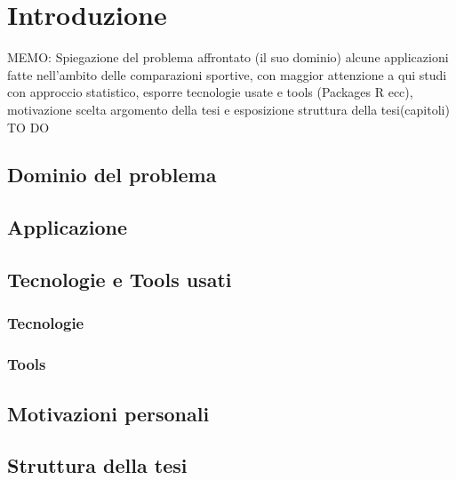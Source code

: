 
\chapter{Introduzione}
\label{cap:introduzione}
MEMO: Spiegazione del problema affrontato (il suo dominio) alcune applicazioni fatte nell'ambito delle comparazioni sportive, con maggior attenzione a qui studi con approccio statistico, esporre tecnologie usate e tools (Packages R ecc), motivazione scelta argomento della tesi e esposizione struttura della tesi(capitoli) TO DO



\section{Dominio del problema}

\section{Applicazione}

\section{Tecnologie e Tools usati}

\subsection{Tecnologie}

\subsection{Tools}

\section{Motivazioni personali}

\section{Struttura della tesi}






